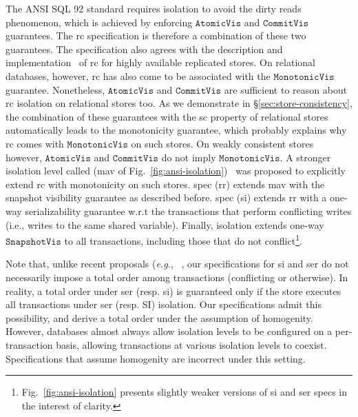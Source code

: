 The ANSI SQL 92 standard requires  isolation to avoid
the dirty reads phenomenon, which is achieved by enforcing
$\mathtt{AtomicVis}$ and $\mathtt{CommitVis}$ guarantees. The {\sc rc}
specification is therefore a combination of these two guarantees. The
specification also agrees with the description and
implementation~\cite{bailishat,pldi15} of {\sc rc} for highly available
replicated stores. On relational databases, however, {\sc rc} has also come
to be associated with the $\mathtt{MonotonicVis}$ guarantee.
Nonetheless, $\mathtt{AtomicVis}$ and $\mathtt{CommitVis}$ are
sufficient to reason about {\sc rc} isolation on relational stores too. As
we demonstrate in \S\ref{sec:store-consistency}, the combination of
these guarantees with the {\sc sc} property of relational stores
automatically leads to the monotonicity guarantee, which probably
explains why {\sc rc} comes with $\mathtt{MonotonicVis}$ on such stores. On
weakly consistent stores however, $\mathtt{AtomicVis}$ and
$\mathtt{CommitVis}$ do not imply $\mathtt{MonotonicVis}$. A stronger
isolation level called  ({\sc mav} of
Fig.~\ref{fig:ansi-isolation})~\cite{bailishat,pldi15} was proposed to
explicitly extend {\sc rc} with monotonicity on such stores.  spec ({\sc rr}) extends {\sc mav} with the snapshot visibility guarantee
as described before.  spec ({\sc si}) extends
{\sc rr} with a one-way serializability guarantee w.r.t the transactions
that perform conflicting writes (i.e., writes to the same shared
variable). Finally,  isolation extends one-way
$\mathtt{SnapshotVis}$ to all transactions, including those that do
not conflict\footnote{Fig.~\ref{fig:ansi-isolation} presents slightly
weaker versions of {\sc si} and {\sc ser} specs in the interest of
clarity.}. 

Note that, unlike recent proposals (\emph{e.g.},
~\cite{gotsmanconcur15}, our specifications for {\sc si} and {\sc ser} do not
necessarily impose a total order among transactions (conflicting or
otherwise). In reality, a total order under {\sc ser} (resp. {\sc si}) is guaranteed
only if the store executes all transactions under {\sc ser} (resp. {\sc SI})
isolation. Our specifications admit this possibility, and derive a total
order under the assumption of homogenity. However, databases almost
always allow isolation levels to be configured on a per-transaction
basis, allowing transactions at various isolation levels to coexist.
Specifications that assume homogenity are incorrect under this
setting.


